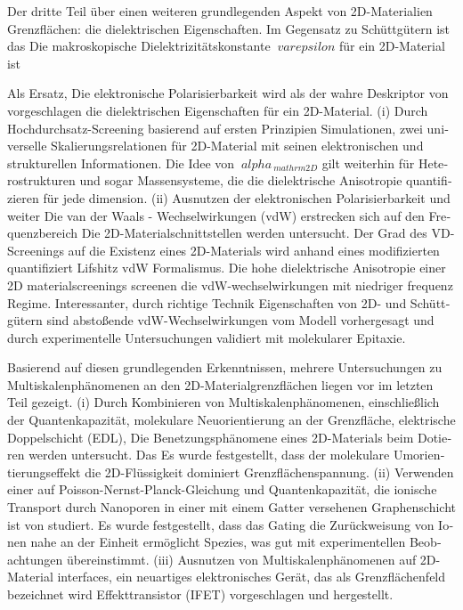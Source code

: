 \begin{otherlanguage}{ngerman}
Der dritte Teil über einen weiteren grundlegenden Aspekt von 2D-Materialien
Grenzflächen: die dielektrischen Eigenschaften.
%
Im Gegensatz zu Schüttgütern ist das
Die makroskopische Dielektrizitätskonstante $ \ varepsilon $ für ein 2D-Material ist

%
Als Ersatz,
Die elektronische Polarisierbarkeit wird als der wahre Deskriptor von vorgeschlagen
die dielektrischen Eigenschaften für ein 2D-Material.
%
%
(i) Durch Hochdurchsatz-Screening basierend auf ersten Prinzipien
Simulationen, zwei universelle Skalierungsrelationen für
2D-Material mit seinen elektronischen und strukturellen Informationen.
%
Die Idee
von $ \ alpha _ {\ mathrm {2D}} $ gilt weiterhin für Heterostrukturen
und sogar Massensysteme, die die dielektrische Anisotropie quantifizieren
für jede dimension.
%
(ii) Ausnutzen der elektronischen Polarisierbarkeit und weiter
Die van der Waals - Wechselwirkungen (vdW) erstrecken sich auf den Frequenzbereich
Die 2D-Materialschnittstellen werden untersucht. Der Grad des VD-Screenings
auf die Existenz eines 2D-Materials wird anhand eines modifizierten quantifiziert
Lifshitz vdW Formalismus. Die hohe dielektrische Anisotropie einer 2D
materialscreenings screenen die vdW-wechselwirkungen mit niedriger frequenz
Regime. Interessanter, durch richtige Technik
Eigenschaften von 2D- und Schüttgütern sind abstoßende vdW-Wechselwirkungen
vom Modell vorhergesagt und durch experimentelle Untersuchungen validiert
mit molekularer Epitaxie.

Basierend auf diesen grundlegenden Erkenntnissen, mehrere
Untersuchungen zu Multiskalenphänomenen an den 2D-Materialgrenzflächen liegen vor
im letzten Teil gezeigt.
%
(i) Durch Kombinieren von Multiskalenphänomenen, einschließlich der Quantenkapazität,
molekulare Neuorientierung an der Grenzfläche, elektrische Doppelschicht (EDL),
Die Benetzungsphänomene eines 2D-Materials beim Dotieren werden untersucht. Das
Es wurde festgestellt, dass der molekulare Umorientierungseffekt die 2D-Flüssigkeit dominiert
Grenzflächenspannung.
%
(ii) Verwenden einer auf
Poisson-Nernst-Planck-Gleichung und Quantenkapazität, die ionische
Transport durch Nanoporen in einer mit einem Gatter versehenen Graphenschicht ist
von studiert. Es wurde festgestellt, dass das Gating die Zurückweisung von Ionen nahe an der Einheit ermöglicht
Spezies, was gut mit experimentellen Beobachtungen übereinstimmt.
%
(iii) Ausnutzen von Multiskalenphänomenen auf 2D-Material
interfaces, ein neuartiges elektronisches Gerät, das als Grenzflächenfeld bezeichnet wird
Effekttransistor (IFET) vorgeschlagen und hergestellt.

\end{otherlanguage}

\endgroup

\vfill